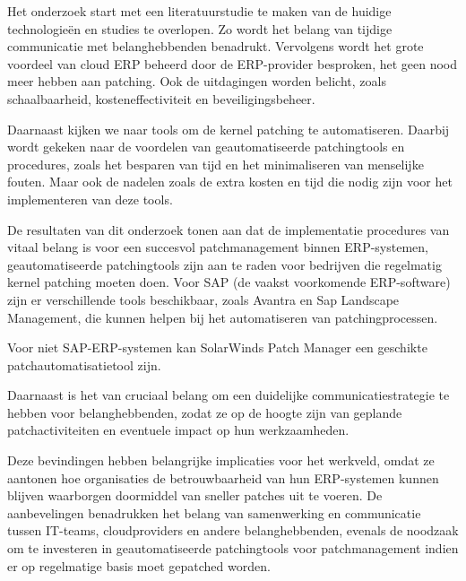 Het onderzoek start met een literatuurstudie te maken van de huidige technologieën en studies te overlopen. Zo wordt het belang van tijdige communicatie met belanghebbenden benadrukt. Vervolgens wordt het grote voordeel van cloud ERP beheerd door de ERP-provider besproken, het geen nood meer hebben aan patching. Ook de uitdagingen worden belicht, zoals schaalbaarheid, kosteneffectiviteit en beveiligingsbeheer.

Daarnaast kijken we naar tools om de kernel patching te automatiseren. Daarbij wordt gekeken naar de voordelen van geautomatiseerde patchingtools en procedures, zoals het besparen van tijd en het minimaliseren van menselijke fouten. Maar ook de nadelen zoals de extra kosten en tijd die nodig zijn voor het implementeren van deze tools.

De resultaten van dit onderzoek tonen aan dat de implementatie procedures van vitaal belang is voor een succesvol patchmanagement binnen ERP-systemen, geautomatiseerde patchingtools zijn aan te raden voor bedrijven die regelmatig kernel patching moeten doen. Voor SAP (de vaakst voorkomende ERP-software) zijn er verschillende tools beschikbaar, zoals Avantra en Sap Landscape Management, die kunnen helpen bij het automatiseren van patchingprocessen. 

Voor niet SAP-ERP-systemen kan SolarWinds Patch Manager een geschikte patchautomatisatietool zijn.

Daarnaast is het van cruciaal belang om een duidelijke communicatiestrategie te hebben voor belanghebbenden, zodat ze op de hoogte zijn van geplande patchactiviteiten en eventuele impact op hun werkzaamheden.

Deze bevindingen hebben belangrijke implicaties voor het werkveld, omdat ze aantonen hoe organisaties de betrouwbaarheid van hun ERP-systemen kunnen blijven waarborgen doormiddel van sneller patches uit te voeren. De aanbevelingen benadrukken het belang van samenwerking en communicatie tussen IT-teams, cloudproviders en andere belanghebbenden, evenals de noodzaak om te investeren in geautomatiseerde patchingtools voor patchmanagement indien er op regelmatige basis moet gepatched worden.